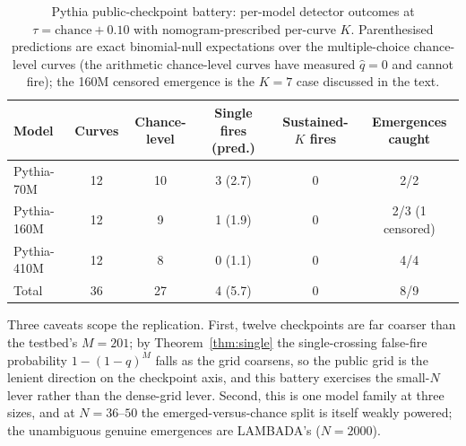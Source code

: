 \documentclass[11pt]{article}
\theoremstyle{plain}
\theoremstyle{definition}
\begin{document}
\begin{table}[htbp]
\centering
\caption{Pythia public-checkpoint battery: per-model detector outcomes at
$\tau=\text{chance}+0.10$ with nomogram-prescribed per-curve $K$. Parenthesised
predictions are exact binomial-null expectations over the multiple-choice chance-level
curves (the arithmetic chance-level curves have measured $\hat q=0$ and cannot fire);
the 160M censored emergence is the $K{=}7$ case discussed in the text.}
\label{tab:pythia}
\small
\begin{tabular}{@{}lccccc@{}}
\toprule
Model & Curves & Chance-level & Single fires (pred.) & Sustained-$K$ fires & Emergences caught \\
\midrule
Pythia-70M & 12 & 10 & 3 (2.7) & 0 & 2/2 \\
Pythia-160M & 12 & 9 & 1 (1.9) & 0 & 2/3 (1 censored) \\
Pythia-410M & 12 & 8 & 0 (1.1) & 0 & 4/4 \\
Total & 36 & 27 & 4 (5.7) & 0 & 8/9 \\
\bottomrule
\end{tabular}
\end{table}

Three caveats scope the replication. First, twelve checkpoints are far coarser than the
testbed's $M=201$; by Theorem~\ref{thm:single} the single-crossing false-fire
probability $1-(1-q)^{M}$ falls as the grid coarsens, so the public grid is the
lenient direction on the checkpoint axis, and this battery exercises the small-$N$
lever rather than the dense-grid lever. Second, this is one model family at three
sizes, and at $N=36$--$50$ the emerged-versus-chance split is itself weakly powered;
the unambiguous genuine emergences are LAMBADA's ($N{=}2000$).
\end{document}
